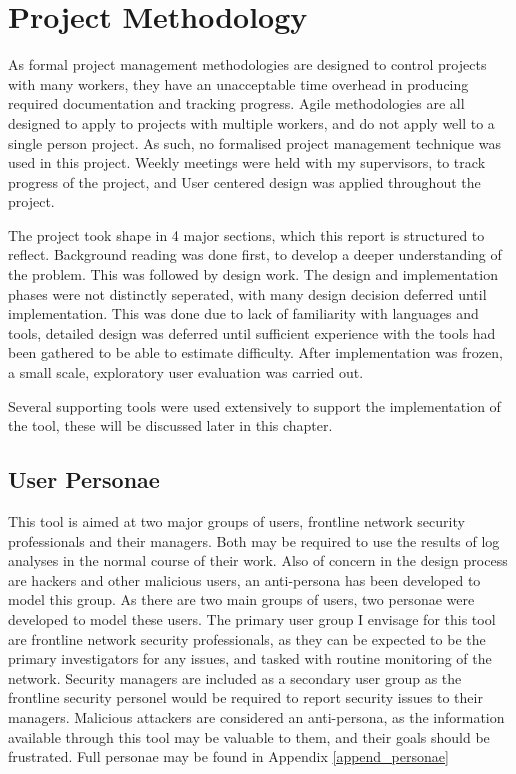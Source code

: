 \chapter{Project Methodology}\label{C:project}

As formal project management methodologies are designed to control projects with many workers, they have an unacceptable time overhead in producing required documentation and tracking progress. Agile methodologies are all designed to apply to projects with multiple workers, and do not apply well to a single person project. As such, no formalised project management technique was used in this project.  
Weekly meetings were held with my supervisors, to track progress of the project, and User centered design was applied throughout the project. 

The project took shape in 4 major sections, which this report is structured to reflect. Background reading was done first, to develop a deeper understanding of the problem. This was followed by design work. The design and implementation phases were not distinctly seperated, with many design decision deferred until implementation. This was done due to lack of familiarity with languages and tools, detailed design was deferred until sufficient experience with the tools had been gathered to be able to estimate difficulty. After implementation was frozen, a small scale, exploratory user evaluation was carried out.

Several supporting tools were used extensively to support the implementation of the tool, these will be discussed later in this chapter. 

\section{User Personae}

This tool is aimed at two major groups of users, frontline network security professionals and their managers.
Both may be required to use the results of log analyses in the normal course of their work. Also of concern in the design process are hackers and other malicious users, an anti-persona has been developed to model this group. As there are two main groups of users, two personae were developed to model these users. 
The primary user group I envisage for this tool are frontline network security professionals, as they can be expected to be the primary investigators for any issues, and tasked with routine monitoring of the network.
Security managers are included as a secondary user group as the frontline security personel would be required to report security issues to their managers.
Malicious attackers are considered an anti-persona, as the information available through this tool may be valuable to them, and their goals should be frustrated.
Full personae may be found in Appendix \ref{append_personae}

